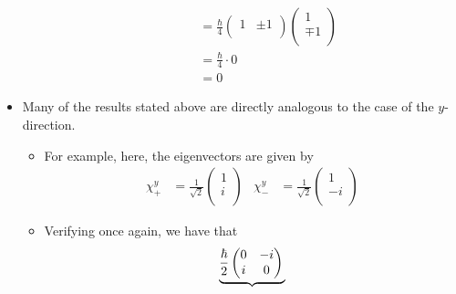\documentclass[../notes.tex]{subfiles}
\begin{document}
\begin{itemize}
\begin{itemize}
\begin{itemize}
\begin{align*}
                &= \frac{\hbar}{4}
                \begin{pmatrix}
                    1 & \pm 1\\
                \end{pmatrix}
                \begin{pmatrix}
                    1\\
                    \mp 1\\
                \end{pmatrix}\\
                &= \frac{\hbar}{4}\cdot 0\\
                &= 0
            \end{align*}
        \end{itemize}
    \end{itemize}
    \item Many of the results stated above are directly analogous to the case of the $y$-direction.
    \begin{itemize}
        \item For example, here, the eigenvectors are given by
        \begin{align*}
            \chi_+^y &= \frac{1}{\sqrt{2}}
            \begin{pmatrix}
                1\\
                i\\
            \end{pmatrix}&
            \chi_-^y &= \frac{1}{\sqrt{2}}
            \begin{pmatrix}
                1\\
                -i\\
            \end{pmatrix}
        \end{align*}
        \item Verifying once again, we have that
        \begin{equation*}
            \underbrace{
                \frac{\hbar}{2}
                \begin{pmatrix}
                    0 & -i\\
                    i & 0\\
                \end{pmatrix}
                \vphantom{
                    \begin{pNiceMatrix}
                        \frac{1}{\sqrt{2}}\\
                        \pm\frac{i}{\sqrt{2}}\\

\end{pNiceMatrix}}}
\end{equation*}
\end{itemize}
\end{itemize}
\end{document}
